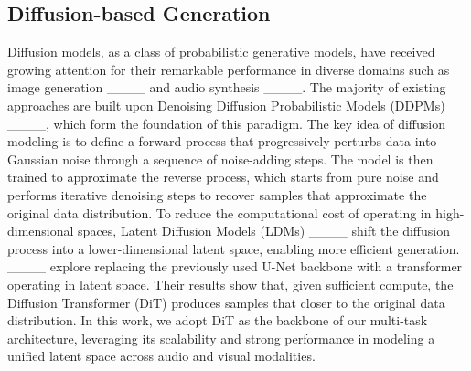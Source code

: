 \subsection{Diffusion-based Generation}\label{subsec:diffusion}
Diffusion models, as a class of probabilistic generative models, have received growing attention for their remarkable performance in diverse domains such as image generation ____ and audio synthesis ____. The majority of existing approaches are built upon Denoising Diffusion Probabilistic Models (DDPMs) ____, which form the foundation of this paradigm. The key idea of diffusion modeling is to define a forward process that progressively perturbs data into Gaussian noise through a sequence of noise-adding steps. The model is then trained to approximate the reverse process, which starts from pure noise and performs iterative denoising steps to recover samples that approximate the original data distribution. To reduce the computational cost of operating in high-dimensional spaces, Latent Diffusion Models (LDMs) ____ shift the diffusion process into a lower-dimensional latent space, enabling more efficient generation. ____ explore replacing the previously used U-Net backbone with a transformer operating in latent space. Their results show that, given sufficient compute, the Diffusion Transformer (DiT) produces samples that closer to the original data distribution. In this work, we adopt DiT as the backbone of our multi-task architecture, leveraging its scalability and strong performance in modeling a unified latent space across audio and visual modalities.